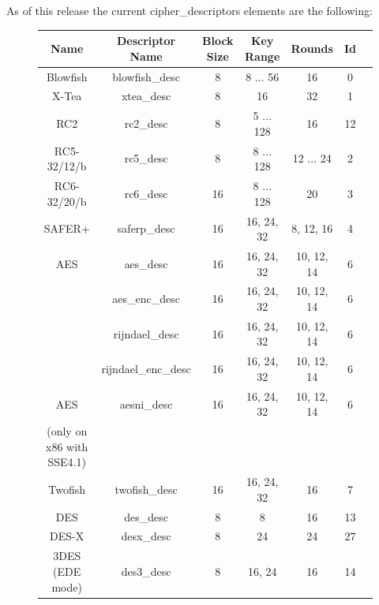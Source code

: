 \documentclass[synpaper]{book}
\begin{document}
As of this release the current cipher\_descriptors elements are the following:
\vfil
{}
       
         
   
\begin{figure}[hpbt]
\begin{small}
\begin{center}
\begin{tabular}{|c|c|c|c|c|c|c|}
     \hline \textbf{Name} & \textbf{Descriptor Name} & \textbf{Block Size} & \textbf{Key Range} & \textbf{Rounds} & \textbf{Id} \\
     \hline Blowfish & blowfish\_desc & 8 & 8 $\ldots$ 56 & 16 & 0 \\
     \hline X-Tea & xtea\_desc & 8 & 16 & 32 & 1 \\
     \hline RC2 & rc2\_desc & 8 & 5 $\ldots$ 128 & 16 & 12 \\
     \hline RC5-32/12/b & rc5\_desc & 8 & 8 $\ldots$ 128 & 12 $\ldots$ 24 & 2 \\
     \hline RC6-32/20/b & rc6\_desc & 16 & 8 $\ldots$ 128 & 20 & 3 \\
     \hline SAFER+ & saferp\_desc &16 & 16, 24, 32 & 8, 12, 16 & 4 \\
     \hline AES & aes\_desc & 16 & 16, 24, 32 & 10, 12, 14 & 6 \\
                & aes\_enc\_desc & 16 & 16, 24, 32 & 10, 12, 14 & 6 \\
                & rijndael\_desc & 16 & 16, 24, 32 & 10, 12, 14 & 6 \\
                & rijndael\_enc\_desc & 16 & 16, 24, 32 & 10, 12, 14 & 6 \\
     \hline AES & aesni\_desc & 16 & 16, 24, 32 & 10, 12, 14 & 6 \\
            (only on x86 with SSE4.1) &&&&& \\
     \hline Twofish & twofish\_desc & 16 & 16, 24, 32 & 16 & 7 \\
     \hline DES & des\_desc & 8 & 8 & 16 & 13 \\
     \hline DES-X & desx\_desc & 8 & 24 & 24 & 27 \\
     \hline 3DES (EDE mode) & des3\_desc & 8 & 16, 24 & 16 & 14 \\

\end{tabular}
\end{center}
\end{small}
\end{figure}
\end{document}
